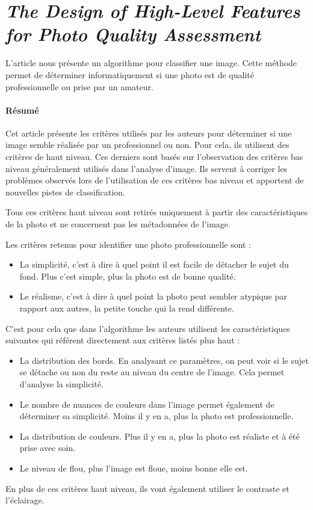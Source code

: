 \documentclass[11pt, french]{report-rd-info}
\begin{document}
\section{\emph{The Design of High-Level Features for Photo Quality Assessment}}
L'article \cite{Ke} nous présente un algorithme pour classifier une image. Cette méthode permet de déterminer informatiquement si une photo est de qualité professionnelle ou prise par un amateur.

\paragraph{Résumé}
Cet article présente les critères utilisés par les auteurs pour déterminer si une image semble réalisée par un professionnel ou non. Pour cela, ils utilisent des critères de haut niveau. Ces derniers sont basés sur l'observation des critères bas niveau généralement utilisés dans l'analyse d'image. Ils servent à corriger les problèmes observés lors de l'utilisation de ces critères bas niveau et apportent de nouvelles pistes de classification.

Tous ces critères haut niveau sont retirés uniquement à partir des caractéristiques de la photo et ne concernent pas les métadonnées de l'image.

Les critères retenus pour identifier une photo professionnelle sont :
\begin{itemize}
\item La simplicité, c'est à dire à quel point il est facile de détacher le sujet du fond. Plus c'est simple, plus la photo est de bonne qualité.
\item Le réalisme, c'est à dire à quel point la photo peut sembler atypique par rapport aux autres, la petite touche qui la rend différente.
\end{itemize}
C'est pour cela que dans l'algorithme les auteurs utilisent les caractéristiques suivantes qui référent directement aux critères listés plus haut :
\begin{itemize}
\item La distribution des bords. En analysant ce paramètres, on peut voir si le sujet se détache ou non du reste au niveau du centre de l'image. Cela permet d'analyse la simplicité.
\item Le nombre de nuances de couleurs dans l'image permet également de déterminer sa simplicité. Moins il y en a, plus la photo est professionnelle.
\item La distribution de couleurs. Plus il y en a, plus la photo est réaliste et à été prise avec soin.
\item Le niveau de flou, plus l'image est floue, moins bonne elle est.
\end{itemize}
En plus de ces critères haut niveau, ils vont également utiliser le contraste et l'éclairage.
\end{document}
